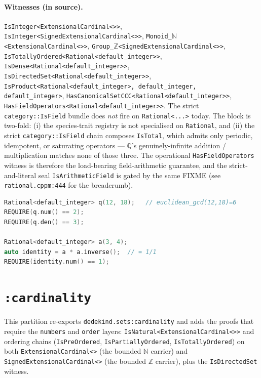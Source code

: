 \documentclass[11pt, a4paper]{report}
\begin{document}
\paragraph{Witnesses (in source).}
\texttt{IsInteger<ExtensionalCardinal<>>}, \texttt{IsInteger<SignedExtensionalCardinal<>>},
\texttt{Monoid\_$\mathbb{N}$<ExtensionalCardinal<>>},
\texttt{Group\_$\mathbb{Z}$<SignedExtensionalCardinal<>>},
\texttt{IsTotallyOrdered<Rational<default\_integer>>},
\texttt{IsDense<Rational<default\_integer>>},
\texttt{IsDirectedSet<Rational<default\_integer>>},
\texttt{IsProduct<Rational<default\_integer>, default\_integer, default\_integer>},
\texttt{HasCanonicalSetCCC<Rational<default\_integer>>},
\texttt{HasFieldOperators<Rational<default\_integer>>}.
The strict \texttt{category::IsField} bundle does \emph{not} fire on
\texttt{Rational<...>} today. The block is two-fold: (i) the species-trait
registry is not specialised on \texttt{Rational}, and (ii) the strict
\texttt{category::IsField} chain composes \texttt{IsTotal}, which admits
only periodic, idempotent, or saturating operators --- $\mathbb{Q}$'s
genuinely-infinite addition / multiplication matches none of those three.
The operational \texttt{HasFieldOperators} witness is therefore the
load-bearing field-arithmetic guarantee, and the strict-and-literal seal
\texttt{IsArithmeticField} is gated by the same FIXME (see
\texttt{rational.cppm:444} for the breadcrumb).

\begin{lstlisting}[language=C++, caption={Numbers: rational simplification and field inverse (from \texttt{rational\_test.cpp}).}, label={lst:numbers-rational}]
Rational<default_integer> q(12, 18);   // euclidean_gcd(12,18)=6
REQUIRE(q.num() == 2);
REQUIRE(q.den() == 3);

Rational<default_integer> a(3, 4);
auto identity = a * a.inverse();  // = 1/1
REQUIRE(identity.num() == 1);
\end{lstlisting}

\section{\texttt{:cardinality}}
\label{sec:numbers-cardinality}

This partition re-exports \texttt{dedekind.sets:cardinality} and adds the
proofs that require the \texttt{numbers} and \texttt{order} layers:
\texttt{IsNatural<ExtensionalCardinal<>>} and ordering chains
(\texttt{IsPreOrdered}, \texttt{IsPartiallyOrdered}, \texttt{IsTotallyOrdered})
on both \texttt{ExtensionalCardinal<>} (the bounded $\mathbb{N}$ carrier) and
\texttt{SignedExtensionalCardinal<>} (the bounded $\mathbb{Z}$ carrier), plus
the \texttt{IsDirectedSet} witness.
\end{document}
